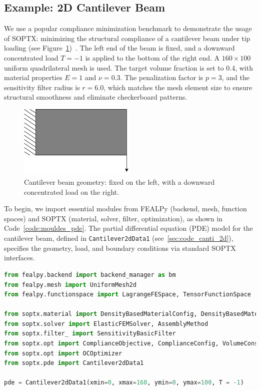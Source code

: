 \documentclass[mathpazo]{cicp}
\begin{document}
\subsection{Example: 2D Cantilever Beam}\label{sec:exp_canti_beam}
We use a popular compliance minimization benchmark to demonstrate the usage of SOPTX: minimizing the structural compliance of a cantilever beam under tip loading (see Figure~\ref{fig:cantilever})~\cite{bendsoe2013topology}. The left end of the beam is fixed, and a downward concentrated load $T = -1$ is applied to the bottom of the right end. A $160 \times 100$ uniform quadrilateral mesh is used. The target volume fraction is set to 0.4, with material properties $E = 1$ and $\nu = 0.3$. The penalization factor is $p = 3$, and the sensitivity filter radius is $r = 6.0$, which matches the mesh element size to ensure structural smoothness and eliminate checkerboard patterns.
\vspace{-2ex} %
\begin{figure}[htp]
	\centering
	\includegraphics[width=0.5\textwidth]{figures/cantilever_2d.png}
	\caption{Cantilever beam geometry: fixed on the left, with a downward concentrated load on the right.}
	\label{fig:cantilever}
\end{figure}
\vspace{-2ex} %

To begin, we import essential modules from FEALPy (backend, mesh, function spaces) and SOPTX (material, solver, filter, optimization), as shown in Code~\ref{code:mouldes_pde}. The partial differential equation (PDE) model for the cantilever beam, defined in \texttt{Cantilever2dData1} (see~\ref{sec:code_canti_2d}), specifies the geometry, load, and boundary conditions via standard SOPTX interfaces.

\vspace{-0.5ex} %
\begin{lstlisting}[language=python, caption={Module imports and PDE model}, label={code:mouldes_pde}]
from fealpy.backend import backend_manager as bm
from fealpy.mesh import UniformMesh2d
from fealpy.functionspace import LagrangeFESpace, TensorFunctionSpace

from soptx.material import DensityBasedMaterialConfig, DensityBasedMaterialInstance
from soptx.solver import ElasticFEMSolver, AssemblyMethod
from soptx.filter_ import SensitivityBasicFilter
from soptx.opt import ComplianceObjective, ComplianceConfig, VolumeConstraint, VolumeConfig
from soptx.opt import OCOptimizer
from soptx.pde import Cantilever2dData1

pde = Cantilever2dData1(xmin=0, xmax=160, ymin=0, ymax=100,	T = -1)
\end{lstlisting}
\vspace{-0.5ex} %
\end{document}
